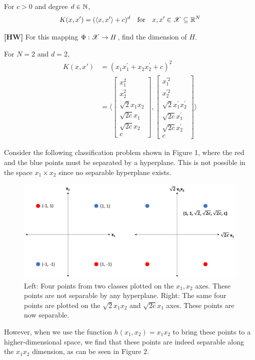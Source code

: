 \documentclass[a4paper,english,12pt]{article}
\begin{document}
\begin{exmp}
	
For $c>0$ and degree $d \in \mathbb{N}$,
\[K(x,x') = (\langle x, x' \rangle + c)^d ~~~ \text{for} ~~~ x,x' \in \mathscr{X} \subseteq \mathbb{R}^N\]

\textbf{[HW]} For this mapping $\Phi: \mathscr{X} \rightarrow H$, find the dimension of $H$.

For $N=2$ and $d=2$,
\begin{align*}
K(x,x') &= (x_1 x_1^{'} + x_2 x_2^{'} + c)^2 \\
&= \langle
\begin{bmatrix}
x_1^2 \\
x_2^2 \\
\sqrt{2} x_1 x_2 \\
\sqrt{2c} x_1 \\
\sqrt{2c} x_2 \\
c
\end{bmatrix}
,
\begin{bmatrix}
x_1^{'2} \\
x_2^{'2} \\
\sqrt{2} x_1^{'} x_2^{'} \\
\sqrt{2c} x_1^{'} \\
\sqrt{2c} x_2^{'} \\
c
\end{bmatrix}
\rangle
\end{align*}

Consider the following classification problem shown in Figure 1, where the red and the blue points must be separated by a hyperplane. This is not possible in the space $x_1 \times x_2$ since no separable hyperplane exists. 

\begin{figure}[h]
	\includegraphics[scale=0.5]{Figures/kernel-methods-polynomial-kernel}
	\centering
	\caption{Left: Four points from two classes plotted on the $x_1, x_2$ axes. These points are not separable by any hyperplane. Right: The same four points are plotted on the $\sqrt{2} x_1 x_2$ and $\sqrt{2c} x_1$ axes. These points are now separable.}
\end{figure}
However, when we use the function $h(x_1,x_2) = x_1 x_2$ to bring these points to a higher-dimensional space, we find that these points are indeed separable along the $x_1 x_2$ dimension, as can be seen in Figure 2.

\end{exmp}
\end{document}
